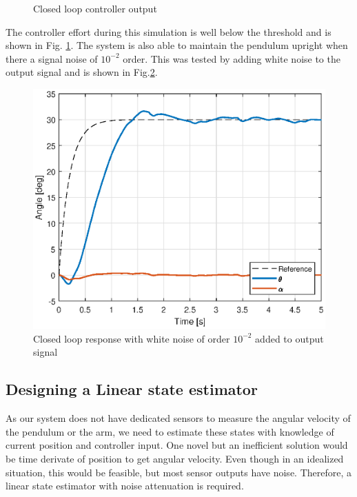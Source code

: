 \documentclass[superscriptaddress,floatfix,reprint,amssymb, amsmath,aps, pre]{revtex4-1}
\begin{document}
{{\begin{figure}[t!]
            \caption{Closed loop controller output}
            \label{fig:controllerEffort}
        \end{figure}
        The controller effort during this simulation is well below the threshold and is shown in Fig. \ref{fig:controllerEffort}. The system is also able to maintain the pendulum upright when there a signal noise of \(10^{-2}\) order. This was tested by adding white noise to the output signal and is shown in Fig.\ref{fig:withNoise}. 
        \begin{figure}[t!]
            \includegraphics[width = \linewidth]{withNoise.eps}
            \caption{Closed loop response with white noise of order \(10^{-2}\) added to output signal}
            \label{fig:withNoise}
        \end{figure}
        \subsection{Designing a Linear state estimator}{
            As our system does not have dedicated sensors to measure the angular velocity of the pendulum or the arm, we need to estimate these states with knowledge of current position and controller input. One novel but an inefficient solution would be time derivate of position to get angular velocity. Even though in an idealized situation, this would be feasible, but most sensor outputs have noise. Therefore, a linear state estimator with noise attenuation is required.   

}}}
\end{document}
